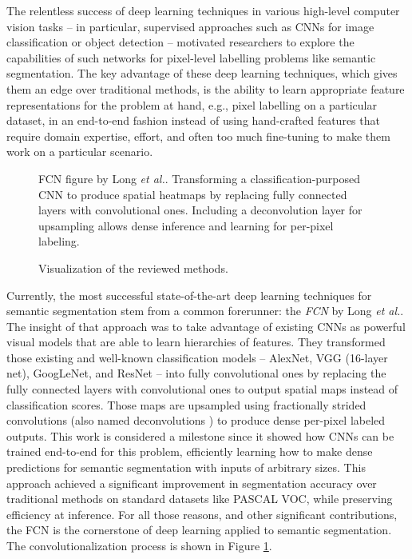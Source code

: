 The relentless success of deep learning techniques in various high-level computer vision tasks -- in particular, supervised approaches such as \acfp{CNN} for image classification or object detection \cite{Krizhevsky2012}\cite{Simonyan2014}\cite{Szegedy2015} --  motivated researchers to explore the capabilities of such networks for pixel-level labelling problems like semantic segmentation. The key advantage of these deep learning techniques, which gives them an edge over traditional methods, is the ability to learn appropriate feature representations for the problem at hand, e.g., pixel labelling on a particular dataset, in an end-to-end fashion instead of using hand-crafted features that require domain expertise, effort, and often too much fine-tuning to make them work on a particular scenario.

\begin{figure}[!hbt]
	\centering
	\caption{\acl{FCN} figure by Long \emph{et al.}\cite{Long2015}. Transforming a classification-purposed \ac{CNN} to produce spatial heatmaps by replacing fully connected layers with convolutional ones. Including a deconvolution layer for upsampling allows dense inference and learning for per-pixel labeling.}
	\label{fig:convolutionalization}
\end{figure}
\begin{figure*}[!t]
	\centering
	\caption{Visualization of the reviewed methods.}
	\label{fig:graph}
\end{figure*}

Currently, the most successful state-of-the-art deep learning techniques for semantic segmentation stem from a common forerunner: the \emph{\acf{FCN}} by Long \emph{et al.}\cite{Long2015}. The insight of that approach was to take advantage of existing \acp{CNN} as powerful visual models that are able to learn hierarchies of features. They transformed those existing and well-known classification models -- AlexNet\cite{Krizhevsky2012}, \ac{VGG} (16-layer net)\cite{Simonyan2014}, GoogLeNet\cite{Szegedy2015}, and ResNet \cite{He2016} -- into fully convolutional ones by replacing the fully connected layers with convolutional ones to output spatial maps instead of classification scores. Those maps are upsampled using fractionally strided convolutions (also named deconvolutions \cite{Zeiler2011}\cite{Zeiler2014}) to produce dense per-pixel labeled outputs. This work is considered a milestone since it showed how \acp{CNN} can be trained end-to-end for this problem, efficiently learning how to make dense predictions for semantic segmentation with inputs of arbitrary sizes. This approach achieved a significant improvement in segmentation accuracy over traditional methods on standard datasets like PASCAL \ac{VOC}, while preserving efficiency at inference. For all those reasons, and other significant contributions, the \ac{FCN} is the cornerstone of deep learning applied to semantic segmentation. The convolutionalization process is shown in Figure \ref{fig:convolutionalization}.

